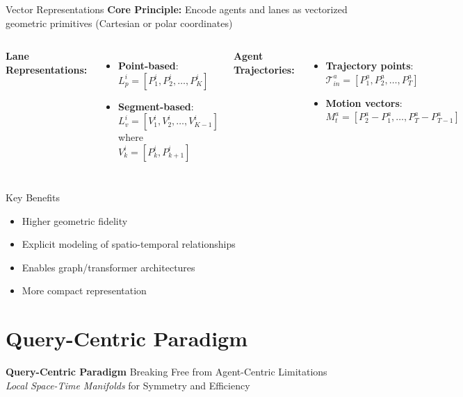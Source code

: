 \documentclass[10pt,aspectratio=169]{beamer}
\begin{document}
\begin{frame}{Vector Representations}
\textbf{Core Principle:} Encode agents and lanes as vectorized geometric primitives (Cartesian or polar coordinates)

\vspace{0.3cm}

\begin{columns}[T]
\textbf{Lane Representations:}
\begin{itemize}
    \item \textbf{Point-based}: $L_p^i = [P_1^i, P_2^i, \ldots, P_K^i]$~\cite{VectorNet2020, zhou2022hivt}
    \item \textbf{Segment-based}: $L_v^i = [V_1^i, V_2^i, \ldots, V_{K-1}^i]$ where $V_{k}^i = [P_k^i, P_{k+1}^i]$~\cite{liang2020learning,zhou2022hivt}
\end{itemize}

\textbf{Agent Trajectories:}
\begin{itemize}
    \item \textbf{Trajectory points}: $\mathcal{T}_{in}^a = [P_1^a, P_2^a, \ldots, P_T^a]$
    \item \textbf{Motion vectors}: $M_t^a = [P_{2}^a - P_{1}^a, \ldots, P_{T}^a - P_{T-1}^a]$~\cite{lmformerYadav2025}
\end{itemize}
\end{columns}

\vspace{0.3cm}

\begin{block}{Key Benefits~\cite{VectorNet2020, lmformerYadav2025}}
\begin{itemize}
    \item Higher geometric fidelity
    \item Explicit modeling of spatio-temporal relationships
    \item Enables graph/transformer architectures
    \item More compact representation
\end{itemize}
\end{block}
\end{frame}

\section{Query-Centric Paradigm}

\begin{frame}[plain]
  \begin{center}
    \vfill
    {\Huge \textbf{Query-Centric Paradigm}}
    \vfill
    {\Large Breaking Free from Agent-Centric Limitations\\\vspace{0.5em}\emph{Local Space-Time Manifolds} for Symmetry and Efficiency}
    \vfill
  \end{center}
\end{frame}
\end{document}
